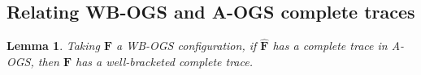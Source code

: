 \documentclass[11pt,a4paper]{amsart}
\theoremstyle{plain}
\theoremstyle{definition}
\theoremstyle{defC}
\theoremstyle{thmC}
\theoremstyle{plain}
\numberwithin{equation}{section}
\newif\ifcutLMCS\cutLMCSfalse
\newcommand{\stack}[2]{#1[#2]}
\newcommand{\stt}{\sigma}
\newcommand{\AOGS}{\mbox{{\rm A-OGS}}\xspace}      %
\newcommand{\WBOGS}{\mbox{{\rm WB-OGS}}\xspace}      %
\newcommand{\genTEcompST}[2]{\mathrel{\bumpeq^{\rm c[#1]}_  {\rm{\lowercase{#2}}}}}
\newcommand{\TEwbcN}[1]{\genTEcompST{#1}{WB}}    %
\newcommand{\TEcN}[1]{\genTEcompST{#1}{A}}       %
\newcommand{\FF}{F}
\newcommand{\GG}{G}
\newcommand{\FFb}{{\bm{\FF}}} %
\newcommand{\GGb}{{\bm{\GG}}} %
\newcommand{\es}{\eraseStack}
\newcommand{\eraseStack}[1]{\widehat{#1}}
\theoremstyle{plain}
\newtheorem{lemma}[thm]{Lemma}
\theoremstyle{definition}
\begin{document}
\subsection{Relating \WBOGS and \AOGS complete traces}
\label{ss:main_wbct}

\ifcutLMCS


\begin{lemma}
\label{l:FFbFF}
For  configurations $\stack \FFb \stt$ and $\stack \GGb \stt$, if 
$ \es\FFb  \TEcN  \stt  \es\GGb$,  then $
\FFb  \TEwbcN \stt \GGb$. 
\end{lemma} 

The problem is the converse. 
This is tackled in the remainder of the section 
(the main result is Lemma~\ref{l:mainWBCN}).
\fi
             
\begin{lemma}
\label{l:TCtoWB}
Taking $\FFb$ a \WBOGS configuration,
if $\es\FFb$ has a complete trace in \AOGS, 
then $\FFb$ has a well-bracketed complete trace. 
\end{lemma} 
\end{document}
